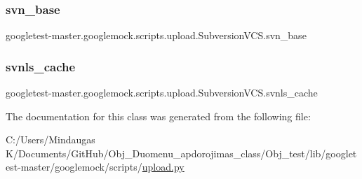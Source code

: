 \subsubsection{\texorpdfstring{svn\_base}{svn\_base}}
{\footnotesize\ttfamily googletest-\/master.\+googlemock.\+scripts.\+upload.\+Subversion\+V\+C\+S.\+svn\+\_\+base}

\mbox{\label{classgoogletest-master_1_1googlemock_1_1scripts_1_1upload_1_1_subversion_v_c_s_a024b702c48df09389810b926a69a3b99}} 
\subsubsection{\texorpdfstring{svnls\_cache}{svnls\_cache}}
{\footnotesize\ttfamily googletest-\/master.\+googlemock.\+scripts.\+upload.\+Subversion\+V\+C\+S.\+svnls\+\_\+cache}



The documentation for this class was generated from the following file\+:\begin{DoxyCompactItemize}
\item 
C\+:/\+Users/\+Mindaugas K/\+Documents/\+Git\+Hub/\+Obj\+\_\+\+Duomenu\+\_\+apdorojimas\+\_\+class/\+Obj\+\_\+test/lib/googletest-\/master/googlemock/scripts/\mbox{\hyperlink{_obj__test_2lib_2googletest-master_2googlemock_2scripts_2upload_8py}{upload.\+py}}\end{DoxyCompactItemize}

